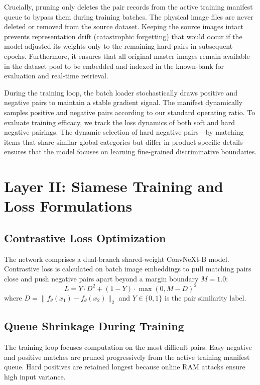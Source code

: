 \documentclass[11pt,a4paper]{article}
\begin{document}
Crucially, pruning only deletes the pair records from the active training manifest queue to bypass them during training batches. The physical image files are never deleted or removed from the source dataset. Keeping the source images intact prevents representation drift (catastrophic forgetting) that would occur if the model adjusted its weights only to the remaining hard pairs in subsequent epochs. Furthermore, it ensures that all original master images remain available in the dataset pool to be embedded and indexed in the known-bank for evaluation and real-time retrieval.



During the training loop, the batch loader stochastically draws positive and negative pairs to maintain a stable gradient signal. The manifest dynamically samples positive and negative pairs according to our standard operating ratio. To evaluate training efficacy, we track the loss dynamics of both soft and hard negative pairings. The dynamic selection of hard negative pairs—by matching items that share similar global categories but differ in product-specific details—ensures that the model focuses on learning fine-grained discriminative boundaries.

\section{Layer II: Siamese Training and Loss Formulations}

\subsection{Contrastive Loss Optimization}
The network comprises a dual-branch shared-weight ConvNeXt-B model. Contrastive loss is calculated on batch image embeddings to pull matching pairs close and push negative pairs apart beyond a margin boundary $M = 1.0$:
\begin{equation}
    L = Y \cdot D^2 + (1-Y) \cdot \max(0, M - D)^2
\end{equation}
where $D = \|f_{\theta}(x_1) - f_{\theta}(x_2)\|_2$ and $Y \in \{0, 1\}$ is the pair similarity label.

\subsection{Queue Shrinkage During Training}
The training loop focuses computation on the most difficult pairs. Easy negative and positive matches are pruned progressively from the active training manifest queue. Hard positives are retained longest because online RAM attacks ensure high input variance.
\end{document}
